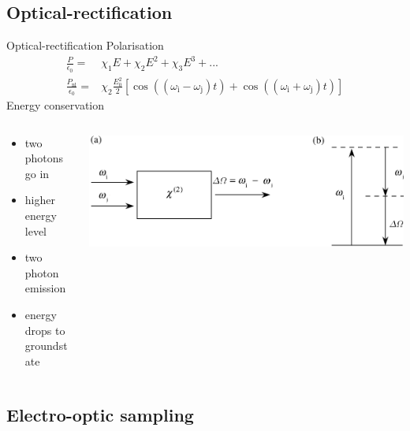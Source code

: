 \documentclass[aspectratio=1610, 9pt]{beamer}
\begin{document}
\subsection{Optical-rectification}
\begin{frame}{Optical-rectification}
 Polarisation \nocite{wiki_book}
  \begin{align}
    \frac{P}{\epsilon_0} =& \chi_1E + \chi_2 E^2 + \chi_3 E^3 + ... \\
    \frac{P_\text{nl}}{\epsilon_0} =& \chi_2 \frac{E_0^2}{2} \left[ \cos((\omega_\text{i} - \omega_\text{j})t) + \cos((\omega_\text{i} + \omega_\text{j})t) \right ]
  \end{align}
  Energy conservation \nocite{boyd2020nonlinear}
  \begin{columns}
    \begin{column}{.4\textwidth}
      \begin{itemize}
        \item two photons go in
        \item higher energy level
        \item two photon emission 
        \item energy drops to groundstate
      \end{itemize}
    \end{column}
    \begin{column}{.5\textwidth}
      \includegraphics[width=\textwidth]{images/diffrence_frequency_mixing.PNG}
    \end{column}
  \end{columns}
\end{frame}

\subsection{Electro-optic sampling}
\end{document}

